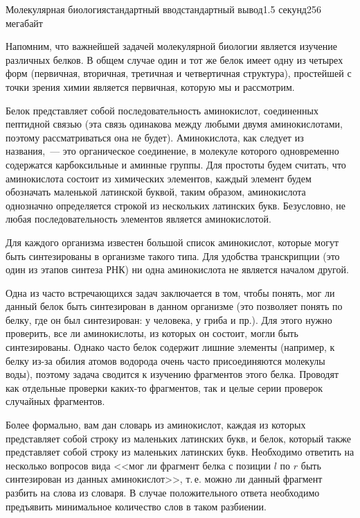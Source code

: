 \begin{problem}{Молекулярная биология}{стандартный ввод}{стандартный вывод}{1.5 секунд}{256 мегабайт}

Напомним, что важнейшей задачей молекулярной биологии является изучение различных белков. В общем случае один и тот же белок имеет одну из четырех форм (первичная, вторичная, третичная и четвертичная структура), простейшей с точки зрения химии является первичная, которую мы и рассмотрим.

Белок представляет собой последовательность аминокислот, соединенных пептидной связью (эта связь одинакова между любыми двумя аминокислотами, поэтому рассматриваться она не будет). Аминокислота, как следует из названия,~--- это органическое соединение, в молекуле которого одновременно содержатся карбоксильные и аминные группы. Для простоты будем считать, что аминокислота состоит из химических элементов, каждый элемент будем обозначать маленькой латинской буквой, таким образом, аминокислота однозначно определяется строкой из нескольких латинских букв. Безусловно, не любая последовательность элементов является аминокислотой.

Для каждого организма известен большой список аминокислот, которые могут быть синтезированы в организме такого типа. Для удобства транскрипции (это один из этапов синтеза РНК) ни одна аминокислота не является началом другой.

Одна из часто встречающихся задач заключается в том, чтобы понять, мог ли данный белок быть синтезирован в данном организме (это позволяет понять по белку, где он был синтезирован: у человека, у гриба и пр.). Для этого нужно проверить, все ли аминокислоты, из которых он состоит, могли быть синтезированы. Однако часто белок содержит лишние элементы (например, к белку из-за обилия атомов водорода очень часто присоединяются молекулы воды), поэтому задача сводится к изучению фрагментов этого белка. Проводят как отдельные проверки каких-то фрагментов, так и целые серии проверок случайных фрагментов.

Более формально, вам дан словарь из аминокислот, каждая из которых представляет собой строку из маленьких латинских букв, и белок, который также представляет собой строку из маленьких латинских букв. Необходимо ответить на несколько вопросов вида <<мог ли фрагмент белка с позиции $l$ по $r$ быть синтезирован из данных аминокислот>>, т.\,е. можно ли данный фрагмент разбить на слова из словаря. В случае положительного ответа необходимо предъявить минимальное количество слов в таком разбиении.




\end{problem}
